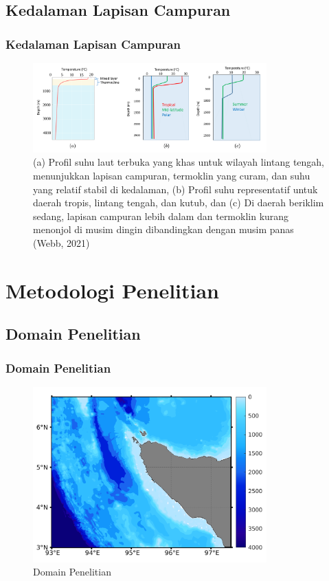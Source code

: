 \documentclass{beamer}
\begin{document}
\subsection{Kedalaman Lapisan Campuran}
\begin{frame}[allowframebreaks]
	\frametitle{Kedalaman Lapisan Campuran}
		\begin{figure}[H]
		\centering
		\includegraphics[width=9cm]{mld_theory.png}
		\caption{(a) Profil suhu laut terbuka yang khas untuk wilayah lintang tengah, menunjukkan lapisan campuran, termoklin yang curam, dan suhu yang relatif stabil di kedalaman, (b) Profil suhu representatif untuk daerah tropis, lintang tengah, dan kutub, dan (c) Di daerah beriklim sedang, lapisan campuran lebih dalam dan termoklin kurang menonjol di musim dingin dibandingkan dengan musim panas (Webb, 2021)}
		\label{fig:mld_theory}
	\end{figure}	
\end{frame}

\section{Metodologi Penelitian}
\subsection{Domain Penelitian}
\begin{frame}
	\frametitle{Domain Penelitian}
	\begin{figure}[H]
		\centering
		\includegraphics[width=9cm]{bathymetri}
		\caption{Domain Penelitian}
		\label{fig:domain}
	\end{figure}
\end{frame}
\end{document}
